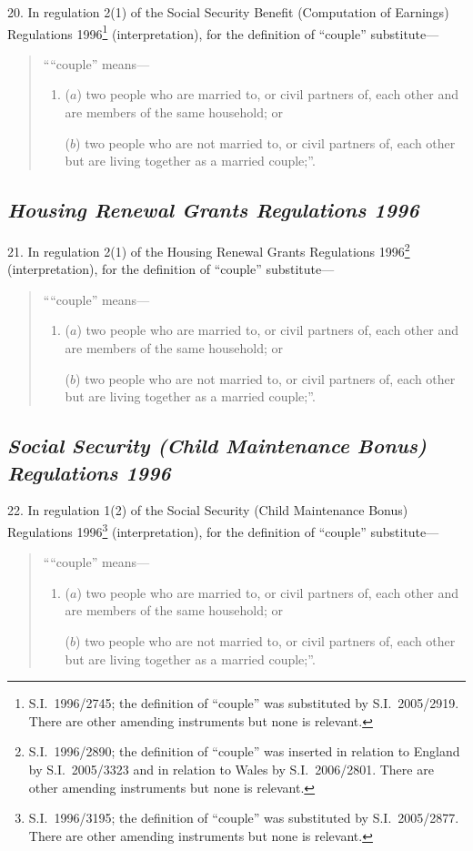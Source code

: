 \documentclass[12pt,a4paper]{article}
\begin{document}
20.  In regulation 2(1) of the Social Security Benefit (Computation of Earnings) Regulations 1996\footnote{S.I.~1996/2745; the definition of “couple” was substituted by S.I.~2005/2919. There are other amending instruments but none is relevant.} (interpretation), for the definition of “couple” substitute—
\begin{quotation}
““couple” means—
\begin{enumerate}\item[]
($a$) 
two people who are married to, or civil partners of, each other and are members of the same household; or

($b$) 
two people who are not married to, or civil partners of, each other but are living together as a married couple;”.
\end{enumerate}
\end{quotation}

\subsection*{\itshape Housing Renewal Grants Regulations 1996}

21.  In regulation 2(1) of the Housing Renewal Grants Regulations 1996\footnote{S.I.~1996/2890; the definition of “couple” was inserted in relation to England by S.I.~2005/3323 and in relation to Wales by S.I.~2006/2801. There are other amending instruments but none is relevant.} (interpretation), for the definition of “couple” substitute—
\begin{quotation}
““couple” means—
\begin{enumerate}\item[]
($a$) 
two people who are married to, or civil partners of, each other and are members of the same household; or

($b$) 
two people who are not married to, or civil partners of, each other but are living together as a married couple;”.
\end{enumerate}
\end{quotation}

\subsection*{\itshape Social Security (Child Maintenance Bonus) Regulations 1996}

22.  In regulation 1(2) of the Social Security (Child Maintenance Bonus) Regulations 1996\footnote{S.I.~1996/3195; the definition of “couple” was substituted by S.I.~2005/2877. There are other amending instruments but none is relevant.} (interpretation), for the definition of “couple” substitute—
\begin{quotation}
““couple” means—
\begin{enumerate}\item[]
($a$) 
two people who are married to, or civil partners of, each other and are members of the same household; or

($b$) 
two people who are not married to, or civil partners of, each other but are living together as a married couple;”.
\end{enumerate}
\end{quotation}
\end{document}
